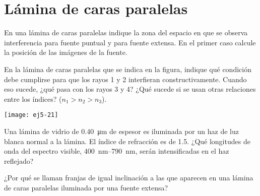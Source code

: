 \section*{Lámina de caras paralelas}

\item En una lámina de caras paralelas indique la zona del espacio en que se observa interferencia para fuente puntual y para fuente extensa.
En el primer caso calcule la posición de las imágenes de la fuente. 


\item
\begin{minipage}[t][2.2cm]{0.6\textwidth}
En la lámina de caras paralelas que se indica en la figura, indique qué condición debe cumplirse para que los rayos 1 y 2 interfieran constructivamente.
Cuando eso sucede, ¿qué pasa con los rayos 3 y 4?
¿Qué sucede si se usan otras relaciones entre los índices? ($n_{1}>n_{2}>n_{3}$).
\end{minipage}
\begin{minipage}[c][1cm][t]{0.35\textwidth}
	\texttt{[image: ej5-21]}
\end{minipage}


\item Una lámina de vidrio de \SI{0.40}{\micro\metre} de espesor es iluminada por un haz de luz blanca normal a la lámina.
El índice de refracción es de \num{1.5}.
¿Qué longitudes de onda del espectro visible, \SIrange{400}{790}{\nano\metre}, serán intensificadas en el haz reflejado?



\item ¿Por qué se llaman franjas de igual inclinación a las que aparecen en una lámina de caras paralelas iluminada por una fuente extensa? 
